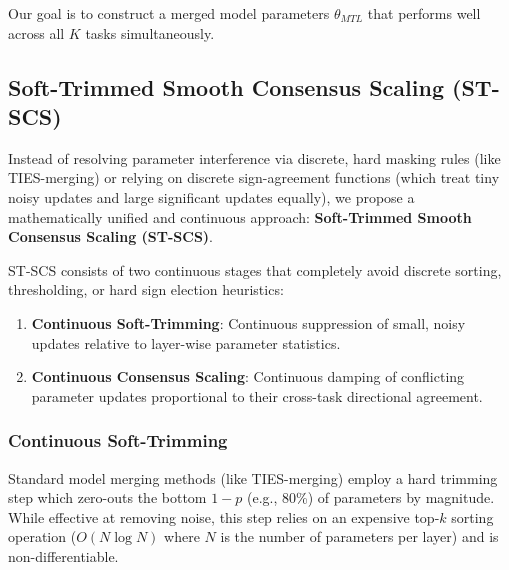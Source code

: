 \documentclass{article}
\theoremstyle{plain}
\theoremstyle{definition}
\theoremstyle{remark}
\begin{document}
Our goal is to construct a merged model parameters $\theta_{MTL}$ that performs well across all $K$ tasks simultaneously.

\subsection{Soft-Trimmed Smooth Consensus Scaling (ST-SCS)}
Instead of resolving parameter interference via discrete, hard masking rules (like TIES-merging) or relying on discrete sign-agreement functions (which treat tiny noisy updates and large significant updates equally), we propose a mathematically unified and continuous approach: \textbf{Soft-Trimmed Smooth Consensus Scaling (ST-SCS)}.

ST-SCS consists of two continuous stages that completely avoid discrete sorting, thresholding, or hard sign election heuristics:
\begin{enumerate}
    \item \textbf{Continuous Soft-Trimming}: Continuous suppression of small, noisy updates relative to layer-wise parameter statistics.
    \item \textbf{Continuous Consensus Scaling}: Continuous damping of conflicting parameter updates proportional to their cross-task directional agreement.
\end{enumerate}

\subsubsection{Continuous Soft-Trimming}
Standard model merging methods (like TIES-merging) employ a hard trimming step which zero-outs the bottom $1-p$ (e.g., 80\%) of parameters by magnitude. While effective at removing noise, this step relies on an expensive top-$k$ sorting operation ($O(N \log N)$ where $N$ is the number of parameters per layer) and is non-differentiable.
\end{document}
